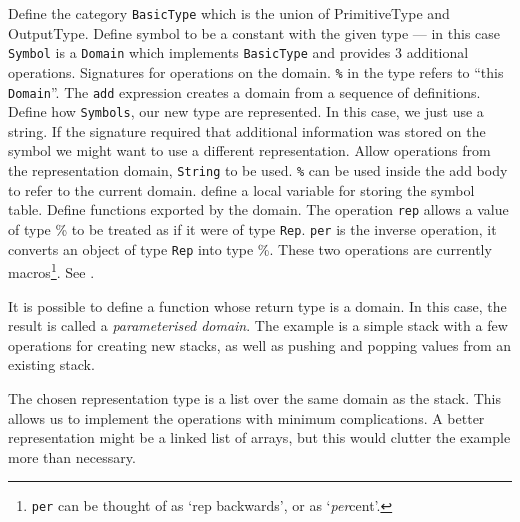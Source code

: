 
\begin{description}
 Define the category \verb+BasicType+ which is the union of
PrimitiveType and OutputType.
 Define symbol to be a constant with the given type --- in
this case \verb"Symbol" is a \verb"Domain"
which implements {\tt BasicType} and
provides 3 additional operations.
 Signatures for operations on the domain. {\tt \%} in the
type refers to ``this \verb"Domain"''.
 The {\tt add} expression creates a domain from a sequence of
definitions. 
 Define how \verb"Symbols",
our new type are represented. In this case,
we just use a string. If the signature required that additional
information was stored on the symbol we might want to use a different
representation.
 Allow operations from the representation domain, \ie{}
{\tt String} to be used.
 {\tt \%} can be used inside the add body to refer to the
current domain.
 define a local variable for storing the symbol table.
 Define functions exported by the domain.
 The operation {\tt rep} allows a value of type
\% to be treated as if it were of type {\tt Rep}. {\tt per} is the
inverse operation, \ie{} it converts an object of type {\tt Rep} into 
type \%. These two operations are currently macros\footnote{ {\tt per}
can be thought of as `rep backwards', or as `{\em per}cent'.}. See
.
\end{description}

\newpage
{}

It is possible to define a function whose return type is a domain. In
this case, the result is called a {\em parameterised domain}.  The
example is a simple stack with a few operations for creating new
stacks, as well as pushing and popping values from an existing stack.


The chosen representation type is a list over the same domain as the
stack. This allows us to implement the operations with minimum
complications. A better representation might be a linked list of
arrays, but this would clutter the example more than necessary.

